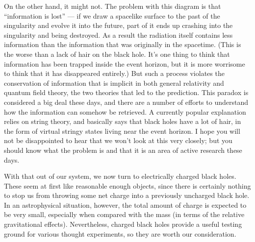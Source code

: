 \begin{figure}[h]
  \centerline{
  }
\end{figure}

On the other hand, it might not.  The problem with this diagram is
that ``information is lost'' --- if we draw a spacelike surface
to the past of the singularity and evolve it into the future, part
of it ends up crashing into the singularity and being destroyed.
As a result the radiation itself contains less information than
the information that was originally in the spacetime.  (This is
the worse than a lack of hair on the black hole.  It's one thing
to think that information has been trapped inside the event horizon,
but it is more worrisome to think that it has disappeared entirely.)
 But such a process
violates the conservation of information that is implicit in both
general relativity and quantum field theory, the two theories that
led to the prediction.  This paradox is considered a big deal these
days, and there are a number of efforts to understand how the 
information can somehow be retrieved.  A currently popular explanation
relies on string theory, and basically says that black holes have a lot
of hair, in the form of virtual stringy states living near the event
horizon.  I hope you will not be disappointed to hear that we won't
look at this very closely; but you should know what the problem is
and that it is an area of active research these days.

With that out of our system, we now turn
to electrically charged black holes.  These
seem at first like reasonable enough objects, since there
is certainly nothing to stop us from throwing some net
charge into a previously uncharged black hole.  In an
astrophysical situation, however, the total amount of charge
is expected to be very small, especially when compared with
the mass (in terms of the relative gravitational effects).
Nevertheless, charged black holes provide a useful testing
ground for various thought experiments, so they are worth
our consideration.

